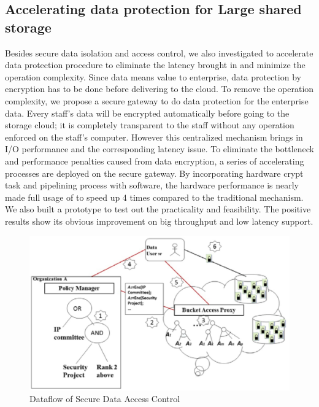\documentclass[10pt]{report}
\begin{document}
			\subsection{Accelerating data protection for Large shared storage}
				Besides secure data isolation and access control, we also investigated to accelerate data protection procedure to eliminate the latency brought in and minimize the operation complexity. Since data means value to enterprise, data protection by encryption has to be done before delivering to the cloud. To remove the operation complexity, we propose a secure gateway to do data protection for the enterprise data. Every staff's data will be encrypted automatically before going to the storage cloud; it is completely transparent to the staff without any operation enforced on the staff's computer. However this centralized mechanism brings in I/O performance and the corresponding latency issue. To eliminate the bottleneck and performance penalties caused from data encryption, a series of accelerating processes are deployed on the secure gateway. By incorporating hardware crypt task and pipelining process with software, the hardware performance is nearly made full usage of to speed up 4 times compared to the traditional mechanism. We also built a prototype to test out the practicality and feasibility. The positive results show its obvious improvement on big throughput and low latency support.
				\begin{figure}[ft]
				\includegraphics[width=\textwidth,height=\textheight,keepaspectratio] {fig2}
				\caption{Dataflow of Secure Data Access Control}
				\label{Figure 2}
				\end{figure}
\end{document}
